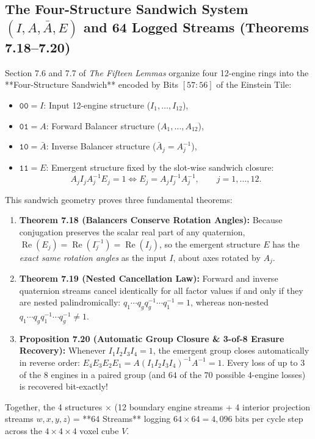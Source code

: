 \documentclass[11pt, a4paper]{article}
\begin{document}
\subsection{The Four-Structure Sandwich System \texorpdfstring{$(I, A, \bar{A}, E)$}{(I, A, A-bar, E)} and 64 Logged Streams (Theorems 7.18--7.20)}
Section 7.6 and 7.7 of \textit{The Fifteen Lemmas} organize four 12-engine rings into the **Four-Structure Sandwich** encoded by Bits $[57:56]$ of the Einstein Tile:
\begin{itemize}
    \item $\texttt{00} = I$: Input 12-engine structure ($I_1, \dots, I_{12}$),
    \item $\texttt{01} = A$: Forward Balancer structure ($A_1, \dots, A_{12}$),
    \item $\texttt{10} = \bar{A}$: Inverse Balancer structure ($\bar{A}_j = A_j^{-1}$),
    \item $\texttt{11} = E$: Emergent structure fixed by the slot-wise sandwich closure:
    \begin{equation}
    A_j I_j A_j^{-1} E_j = 1 \iff E_j = A_j I_j^{-1} A_j^{-1}, \qquad j = 1, \dots, 12.
    \end{equation}
\end{itemize}
This sandwich geometry proves three fundamental theorems:
\begin{enumerate}
    \item \textbf{Theorem 7.18 (Balancers Conserve Rotation Angles):} Because conjugation preserves the scalar real part of any quaternion, $\operatorname{Re}(E_j) = \operatorname{Re}(I_j^{-1}) = \operatorname{Re}(I_j)$, so the emergent structure $E$ has the \textit{exact same rotation angles} as the input $I$, about axes rotated by $A_j$.
    \item \textbf{Theorem 7.19 (Nested Cancellation Law):} Forward and inverse quaternion streams cancel identically for all factor values if and only if they are nested palindromically: $q_1 \cdots q_g q_g^{-1} \cdots q_1^{-1} = 1$, whereas non-nested $q_1 \cdots q_g q_1^{-1} \cdots q_g^{-1} \neq 1$.
    \item \textbf{Proposition 7.20 (Automatic Group Closure \& 3-of-8 Erasure Recovery):} Whenever $I_1 I_2 I_3 I_4 = 1$, the emergent group closes automatically in reverse order: $E_4 E_3 E_2 E_1 = A(I_1 I_2 I_3 I_4)^{-1}A^{-1} = 1$. Every loss of up to $3$ of the $8$ engines in a paired group (and $64$ of the $70$ possible 4-engine losses) is recovered bit-exactly!
\end{enumerate}
Together, the 4 structures $\times$ (12 boundary engine streams + 4 interior projection streams $w, x, y, z$) = **$64$ Streams** logging $64 \times 64 = 4,096\text{ bits}$ per cycle step across the $4\times 4\times 4$ voxel cube $V$.
\end{document}
